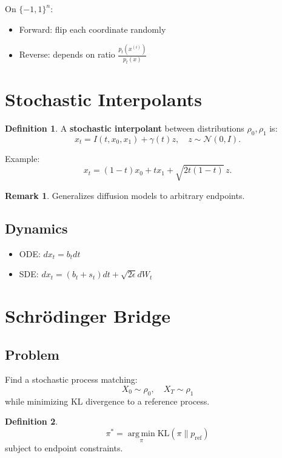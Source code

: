 \documentclass[12pt,oneside]{book}
\numberwithin{equation}{section}
\theoremstyle{definition}
\newtheorem{definition}{Definition}[section]
\newtheorem{remark}{Remark}[section]
\theoremstyle{plain}
\theoremstyle{remark}
\newcommand{\argmin}{\operatorname*{arg\,min}}
\newcommand{\Normal}{\mathcal{N}}
\begin{document}
On $\{-1,1\}^n$:
\begin{itemize}
    \item Forward: flip each coordinate randomly
    \item Reverse: depends on ratio $\frac{p_t(x^{(i)})}{p_t(x)}$
\end{itemize}

\section{Stochastic Interpolants}

\begin{definition}
A \textbf{stochastic interpolant} between distributions $\rho_0,\rho_1$ is:
\[
x_t = I(t,x_0,x_1) + \gamma(t) z,
\quad z \sim \Normal(0,I).
\]
\end{definition}

Example:
\[
x_t = (1-t)x_0 + t x_1 + \sqrt{2t(1-t)}\,z.
\]

\begin{remark}
Generalizes diffusion models to arbitrary endpoints.
\end{remark}

\subsection{Dynamics}

\begin{itemize}
    \item ODE: $dx_t = b_t dt$
    \item SDE: $dx_t = (b_t + s_t)dt + \sqrt{2\epsilon}dW_t$
\end{itemize}

\section{Schrödinger Bridge}

\subsection{Problem}

Find a stochastic process matching:
\[
X_0 \sim \rho_0,\quad X_T \sim \rho_1
\]
while minimizing KL divergence to a reference process.

\begin{definition}
\[
\pi^* = \argmin_\pi \mathrm{KL}(\pi \| p_{\text{ref}})
\]
subject to endpoint constraints.
\end{definition}
\end{document}
